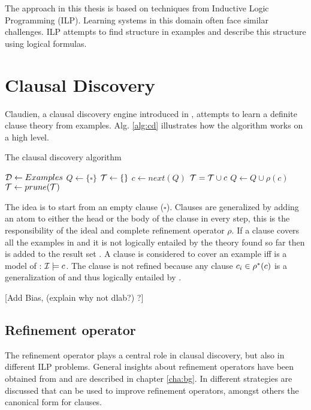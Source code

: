The approach in this thesis is based on techniques from Inductive Logic Programming (ILP).
Learning systems in this domain often face similar challenges.
ILP attempts to find structure in examples and describe this structure using logical formulas.

\section{Clausal Discovery}
Claudien, a clausal discovery engine introduced in \cite{DeRaedt:ClausalDiscovery}, attempts to learn a definite clause theory from examples.
Alg. \ref{alg:cd} illustrates how the algorithm works on a high level. 

\begin{algorithm}
	\caption{The clausal discovery algorithm}
	\label{alg:cd}

	\begin{algorithmic}
	\State $\mathcal{D} \gets Examples$
	\State $Q \gets \{\square\}$
	\State $\mathcal{T} \gets \{\}$
		\State $c \gets next(Q)$
				\State $\mathcal{T} = \mathcal{T} \cup c$
			\EndIf
		\Else
			\State $Q \gets Q \cup \rho(c)$
		\EndIf
	\EndWhile
	\State $\mathcal{T} \gets prune(\mathcal{T})$
	\State \Return {}
	\end{algorithmic}
\end{algorithm}

The idea is to start from an empty clause ($\square$).
Clauses are generalized by adding an atom to either the head or the body of the clause in every step, this is the responsibility of the ideal and complete refinement operator $\rho$.
If a clause  covers all the examples in  and it is not logically entailed by the theory found so far then  is added to the result set .
A clause  is considered to cover an example  iff  is a model of : $\mathcal{I} \models c$.
The clause  is not refined because any clause $c_i \in \rho^*(c)$ is a generalization of  and thus logically entailed by .

[Add Bias, (explain why not dlab?) ?]

\subsection{Refinement operator}
The refinement operator plays a central role in clausal discovery, but also in different ILP problems.
General insights about refinement operators have been obtained from \cite{DeRaedt:LRLearning} and are described in chapter \ref{cha:bg}.
In \cite{DeRaedt:CondensedRepresentations} different strategies are discussed that can be used to improve refinement operators, amongst others the canonical form for clauses.

